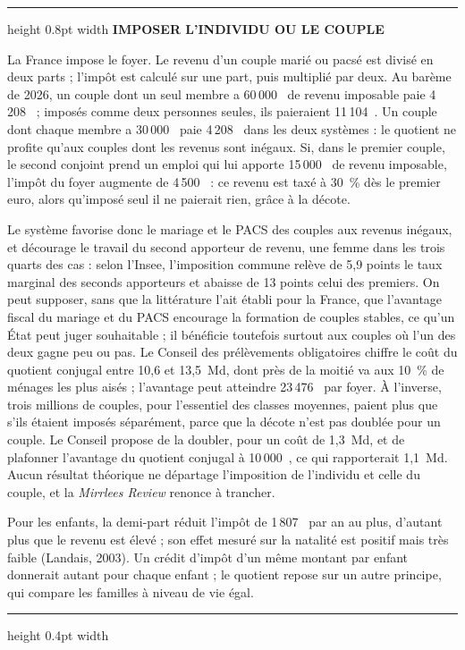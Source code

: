 \documentclass[11pt,a4paper]{article}
\providecommand{\euro}{\texteuro}
\newenvironment{encadre}[1]
  {\par\medskip\noindent\begin{minipage}{\linewidth}%
   \color{encre}\setlength{\parskip}{0.6em}%
   \hrule height 0.8pt width \linewidth \vspace{6pt}%
   {\footnotesize\bfseries\color{vert}\MakeUppercase{#1}}\par\vspace{-2pt}%
   \small}
  {\par\vspace{4pt}\hrule height 0.4pt width \linewidth\end{minipage}\par\medskip}
\begin{document}
\begin{encadre}{Imposer l'individu ou le couple}
La France impose le foyer. Le revenu d'un couple marié ou pacsé est divisé en deux parts ; l'impôt
est calculé sur une part, puis multiplié par deux. Au barème de 2026, un couple dont un seul membre
a 60\,000~\euro{} de revenu imposable paie 4\,208~\euro{} ; imposés comme deux personnes seules, ils
paieraient 11\,104~\euro{}. Un couple dont chaque membre a 30\,000~\euro{} paie 4\,208~\euro{} dans
les deux systèmes : le quotient ne profite qu'aux couples dont les revenus sont inégaux. Si, dans le
premier couple, le second conjoint prend un emploi qui lui apporte 15\,000~\euro{} de revenu
imposable, l'impôt du foyer augmente de 4\,500~\euro{} : ce revenu est taxé à 30~\% dès le premier
euro, alors qu'imposé seul il ne paierait rien, grâce à la décote.

Le système favorise donc le mariage et le PACS des couples aux revenus inégaux, et décourage le
travail du second apporteur de revenu, une femme dans les trois quarts des cas : selon l'Insee,
l'imposition commune relève de 5,9 points le taux marginal des seconds apporteurs et abaisse de
13 points celui des premiers. On peut supposer, sans que la littérature l'ait établi pour la
France, que l'avantage fiscal du mariage et du PACS encourage la formation de couples stables, ce
qu'un État peut juger souhaitable ; il bénéficie toutefois surtout aux couples où l'un des deux
gagne peu ou pas. Le Conseil des prélèvements obligatoires chiffre le coût du quotient conjugal
entre 10,6 et 13,5~Md\euro{}, dont près de la moitié va aux 10~\% de ménages les plus aisés ;
l'avantage peut atteindre 23\,476~\euro{} par foyer. À l'inverse, trois millions de couples, pour
l'essentiel des classes moyennes, paient plus que s'ils étaient imposés séparément, parce que la
décote n'est pas doublée pour un couple. Le Conseil propose de la doubler, pour un coût de
1,3~Md\euro{}, et de plafonner l'avantage du quotient conjugal à 10\,000~\euro{}, ce qui
rapporterait 1,1~Md\euro{}. Aucun résultat théorique ne départage l'imposition de l'individu et
celle du couple, et la \emph{Mirrlees Review} renonce à trancher.

Pour les enfants, la demi-part réduit l'impôt de 1\,807~\euro{} par an au plus, d'autant plus que le
revenu est élevé ; son effet mesuré sur la natalité est positif mais très faible (Landais, 2003). Un
crédit d'impôt d'un même montant par enfant donnerait autant pour chaque enfant ; le quotient repose
sur un autre principe, qui compare les familles à niveau de vie égal.
\end{encadre}
\end{document}
